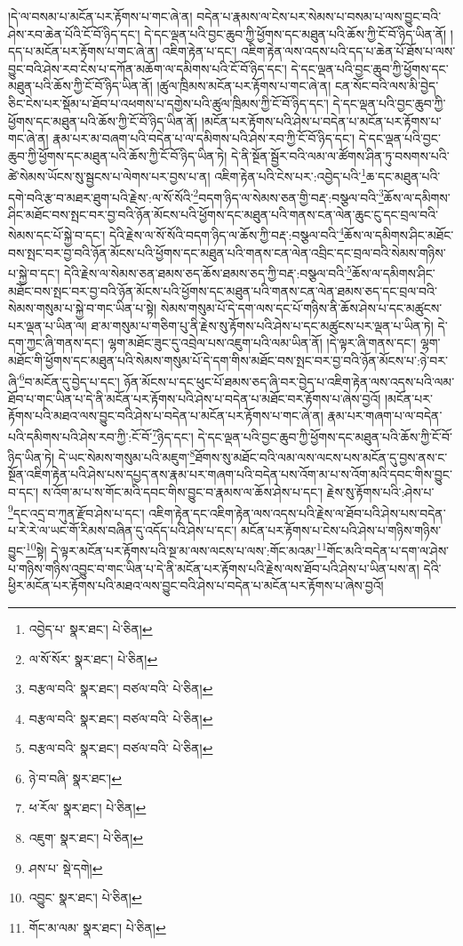 །དེ་ལ་བསམ་པ་མངོན་པར་རྟོགས་པ་གང་ཞེ་ན། བདེན་པ་རྣམས་ལ་ངེས་པར་སེམས་པ་བསམ་པ་ལས་བྱུང་བའི་ཤེས་རབ་ཆེན་པོའི་ངོ་བོ་ཉིད་དང་། དེ་དང་ལྡན་པའི་བྱང་ཆུབ་ཀྱི་ཕྱོགས་དང་མཐུན་པའི་ཆོས་ཀྱི་ངོ་བོ་ཉིད་ཡིན་ནོ། །དད་པ་མངོན་པར་རྟོགས་པ་གང་ཞེ་ན། འཇིག་རྟེན་པ་དང་། འཇིག་རྟེན་ལས་འདས་པའི་དད་པ་ཆེན་པོ་ཐོས་པ་ལས་བྱུང་བའི་ཤེས་རབ་ངེས་པ་དཀོན་མཆོག་ལ་དམིགས་པའི་ངོ་བོ་ཉིད་དང་། དེ་དང་ལྡན་པའི་བྱང་ཆུབ་ཀྱི་ཕྱོགས་དང་མཐུན་པའི་ཆོས་ཀྱི་ངོ་བོ་ཉིད་ཡིན་ནོ། །ཚུལ་ཁྲིམས་མངོན་པར་རྟོགས་པ་གང་ཞེ་ན། ངན་སོང་བའི་ལས་མི་བྱེད་ཅིང་ངེས་པར་སྡོམ་པ་ཐོབ་པ་འཕགས་པ་དགྱེས་པའི་ཚུལ་ཁྲིམས་ཀྱི་ངོ་བོ་ཉིད་དང་། དེ་དང་ལྡན་པའི་བྱང་ཆུབ་ཀྱི་ཕྱོགས་དང་མཐུན་པའི་ཆོས་ཀྱི་ངོ་བོ་ཉིད་ཡིན་ནོ། །མངོན་པར་རྟོགས་པའི་ཤེས་པ་བདེན་པ་མངོན་པར་རྟོགས་པ་གང་ཞེ་ན། རྣམ་པར་མ་བཞག་པའི་བདེན་པ་ལ་དམིགས་པའི་ཤེས་རབ་ཀྱི་ངོ་བོ་ཉིད་དང་། དེ་དང་ལྡན་པའི་བྱང་ཆུབ་ཀྱི་ཕྱོགས་དང་མཐུན་པའི་ཆོས་ཀྱི་ངོ་བོ་ཉིད་ཡིན་ཏེ། དེ་ནི་སྔོན་སྦྱོར་བའི་ལམ་ལ་ཚོགས་ཤིན་ཏུ་བསགས་པའི་ཚེ་སེམས་ཡོངས་སུ་སྦྱངས་པ་ལེགས་པར་བྱས་པ་ན། འཇིག་རྟེན་པའི་ངེས་པར་:འབྱེད་པའི་\footnote{འབྱེད་པ་  སྣར་ཐང་།  པེ་ཅིན། }ཆ་དང་མཐུན་པའི་དགེ་བའི་རྩ་བ་མཐར་ཐུག་པའི་རྗེས་:ལ་སོ་སོའི་\footnote{ལ་སོ་སོར་  སྣར་ཐང་།  པེ་ཅིན། }བདག་ཉིད་ལ་སེམས་ཅན་གྱི་བརྡ་:བསྩལ་བའི་\footnote{བརྩལ་བའི་  སྣར་ཐང་། བཙལ་བའི་  པེ་ཅིན། }ཆོས་ལ་དམིགས་ཤིང་མཐོང་བས་སྤང་བར་བྱ་བའི་ཉོན་མོངས་པའི་ཕྱོགས་དང་མཐུན་པའི་གནས་ངན་ལེན་ཆུང་ངུ་དང་བྲལ་བའི་སེམས་དང་པོ་སྐྱེ་བ་དང་། དེའི་རྗེས་ལ་སོ་སོའི་བདག་ཉིད་ལ་ཆོས་ཀྱི་བརྡ་:བསྩལ་བའི་\footnote{བརྩལ་བའི་  སྣར་ཐང་། བཙལ་བའི་  པེ་ཅིན། }ཆོས་ལ་དམིགས་ཤིང་མཐོང་བས་སྤང་བར་བྱ་བའི་ཉོན་མོངས་པའི་ཕྱོགས་དང་མཐུན་པའི་གནས་ངན་ལེན་འབྲིང་དང་བྲལ་བའི་སེམས་གཉིས་པ་སྐྱེ་བ་དང་། དེའི་རྗེས་ལ་སེམས་ཅན་ཐམས་ཅད་ཆོས་ཐམས་ཅད་ཀྱི་བརྡ་:བསྩལ་བའི་\footnote{བརྩལ་བའི་  སྣར་ཐང་། བཙལ་བའི་  པེ་ཅིན། }ཆོས་ལ་དམིགས་ཤིང་མཐོང་བས་སྤང་བར་བྱ་བའི་ཉོན་མོངས་པའི་ཕྱོགས་དང་མཐུན་པའི་གནས་ངན་ལེན་ཐམས་ཅད་དང་བྲལ་བའི་སེམས་གསུམ་པ་སྐྱེ་བ་གང་ཡིན་པ་སྟེ། སེམས་གསུམ་པོ་དེ་དག་ལས་དང་པོ་གཉིས་ནི་ཆོས་ཤེས་པ་དང་མཚུངས་པར་ལྡན་པ་ཡིན་ལ། ཐ་མ་གསུམ་པ་གཅིག་པུ་ནི་རྗེས་སུ་རྟོགས་པའི་ཤེས་པ་དང་མཚུངས་པར་ལྡན་པ་ཡིན་ཏེ། དེ་དག་ཀྱང་ཞི་གནས་དང་། ལྷག་མཐོང་ཟུང་དུ་འབྲེལ་པས་འཇུག་པའི་ལམ་ཡིན་ནོ། །དེ་ལྟར་ཞི་གནས་དང་། ལྷག་མཐོང་གི་ཕྱོགས་དང་མཐུན་པའི་སེམས་གསུམ་པོ་དེ་དག་གིས་མཐོང་བས་སྤང་བར་བྱ་བའི་ཉོན་མོངས་པ་:ཉེ་བར་ཞི་\footnote{ཉེ་བ་བཞི་  སྣར་ཐང་། }བ་མངོན་དུ་བྱེད་པ་དང་། ཉོན་མོངས་པ་དང་ཕུང་པོ་ཐམས་ཅད་ཞི་བར་བྱེད་པ་འཇིག་རྟེན་ལས་འདས་པའི་ལམ་ཐོབ་པ་གང་ཡིན་པ་དེ་ནི་མངོན་པར་རྟོགས་པའི་ཤེས་པ་བདེན་པ་མཐོང་བར་རྟོགས་པ་ཞེས་བྱའོ། །མངོན་པར་རྟོགས་པའི་མཐའ་ལས་བྱུང་བའི་ཤེས་པ་བདེན་པ་མངོན་པར་རྟོགས་པ་གང་ཞེ་ན། རྣམ་པར་གཞག་པ་ལ་བདེན་པའི་དམིགས་པའི་ཤེས་རབ་ཀྱི་:ངོ་བོ་\footnote{ཕ་རོལ་  སྣར་ཐང་།  པེ་ཅིན། }ཉིད་དང་། དེ་དང་ལྡན་པའི་བྱང་ཆུབ་ཀྱི་ཕྱོགས་དང་མཐུན་པའི་ཆོས་ཀྱི་ངོ་བོ་ཉིད་ཡིན་ཏེ། དེ་ཡང་སེམས་གསུམ་པའི་མཇུག་\footnote{འཇུག་  སྣར་ཐང་།  པེ་ཅིན། }ཐོགས་སུ་མཐོང་བའི་ལམ་ལས་ལངས་པས་མངོན་དུ་བྱས་ནས་ང་སྔོན་འཇིག་རྟེན་པའི་ཤེས་པས་དཔྱད་ནས་རྣམ་པར་གཞག་པའི་བདེན་པས་འོག་མ་པ་ས་འོག་མའི་དབང་གིས་བྱུང་བ་དང་། ས་འོག་མ་པ་ས་གོང་མའི་དབང་གིས་བྱུང་བ་རྣམས་ལ་ཆོས་ཤེས་པ་དང་། རྗེས་སུ་རྟོགས་པའི་:ཤེས་པ་\footnote{ཤས་པ་  སྡེ་དགེ། }དང་འདྲ་བ་ཀུན་རྫོབ་ཤེས་པ་དང་། འཇིག་རྟེན་དང་འཇིག་རྟེན་ལས་འདས་པའི་རྗེས་ལ་ཐོབ་པའི་ཤེས་པས་བདེན་པ་རེ་རེ་ལ་ཡང་གོ་རིམས་བཞིན་དུ་འདོད་པའི་ཤེས་པ་དང་། མངོན་པར་རྟོགས་པ་ངེས་པའི་ཤེས་པ་གཉིས་གཉིས་བྱུང་\footnote{འབྱུང་  སྣར་ཐང་།  པེ་ཅིན། }སྟེ། དེ་ལྟར་མངོན་པར་རྟོགས་པའི་སྔ་མ་ལས་ལངས་པ་ལས་:གོང་མའམ་\footnote{གོང་མ་ལམ་  སྣར་ཐང་།  པེ་ཅིན། }གོང་མའི་བདེན་པ་དག་ལ་ཤེས་པ་གཉིས་གཉིས་འབྱུང་བ་གང་ཡིན་པ་དེ་ནི་མངོན་པར་རྟོགས་པའི་རྗེས་ལས་ཐོབ་པའི་ཤེས་པ་ཡིན་པས་ན། དེའི་ཕྱིར་མངོན་པར་རྟོགས་པའི་མཐའ་ལས་བྱུང་བའི་ཤེས་པ་བདེན་པ་མངོན་པར་རྟོགས་པ་ཞེས་བྱའོ། 